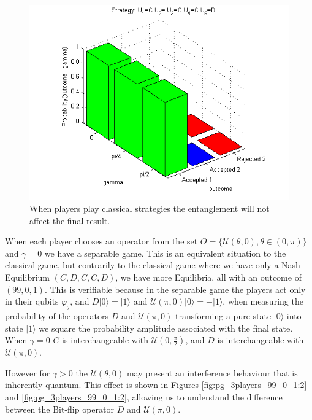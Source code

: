 \begin{figure}[h!]
\centering 
\includegraphics[scale=0.80]{Figures/1.5qubit/CDCCD.png}
\caption{When players play classical strategies the entanglement will not affect the final result. }
\label{fig:pg_3players_99_0_1}
\end{figure}

When each player chooses an operator from the set $O = \{ \mathcal{U} ( \theta , 0) , \theta \in (0, \pi) \}$ and $\gamma=0$ we have a separable game. This is an equivalent situation to the classical game, but contrarily to the classical game where we have only a Nash Equilibrium $(C,D,C,C,D)$, we have more Equilibria, all with an outcome of $(99, 0, 1)$. This is verifiable because in the separable game the players act only in their qubits $\varphi_{j}$, and $D\vert 0\rangle =\vert 1 \rangle$ and $\mathcal{U}( \pi, 0) \vert 0 \rangle = - \vert 1 \rangle $, when measuring the probability of the operators $D$ and $\mathcal{U}( \pi, 0)$ transforming a pure state $\vert 0 \rangle$ into state $\vert 1 \rangle$ we square the probability amplitude associated with the final state. When $\gamma = 0$  $C$ is interchangeable with $\mathcal{U}(0, \frac{\pi}{2})$, and $D$ is interchangeable with $\mathcal{U}( \pi, 0)$.

However for $\gamma >0$ the $\mathcal{U} ( \theta , 0)$ may present an interference behaviour that is inherently quantum. This effect is shown in Figures \ref{fig:pg_3players_99_0_1:2} and \ref{fig:pg_3players_99_0_1:2}, allowing us to understand the difference between the Bit-flip operator $D$ and $\mathcal{U} ( \pi , 0)$.



